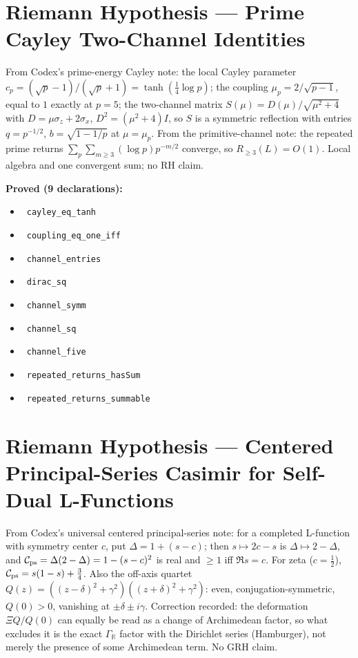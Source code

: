 \documentclass{report}
\theoremstyle{definition}
\begin{document}
\section{Riemann Hypothesis --- Prime Cayley Two-Channel Identities}
From Codex's prime-energy Cayley note: the local Cayley parameter $c_p=(\sqrt p-1)/(\sqrt p+1)=\tanh(\tfrac14\log p)$; the coupling $\mu_p=2/\sqrt{p-1}$, equal to $1$ exactly at $p=5$; the two-channel matrix $S(\mu)=D(\mu)/\sqrt{\mu^2+4}$ with $D=\mu\sigma_z+2\sigma_x$, $D^2=(\mu^2+4)I$, so $S$ is a symmetric reflection with entries $q=p^{-1/2}$, $b=\sqrt{1-1/p}$ at $\mu=\mu_p$. From the primitive-channel note: the repeated prime returns $\sum_p\sum_{m\ge3}(\log p)p^{-m/2}$ converge, so $R_{\ge3}(L)=O(1)$. Local algebra and one convergent sum; no RH claim.

\noindent\textbf{Proved (9 declarations):}
\begin{itemize}
  \item {}\leanok\ \texttt{cayley\_eq\_tanh}
  \item {}\leanok\ \texttt{coupling\_eq\_one\_iff}
  \item {}\leanok\ \texttt{channel\_entries}
  \item {}\leanok\ \texttt{dirac\_sq}
  \item {}\leanok\ \texttt{channel\_symm}
  \item {}\leanok\ \texttt{channel\_sq}
  \item {}\leanok\ \texttt{channel\_five}
  \item {}\leanok\ \texttt{repeated\_returns\_hasSum}
  \item {}\leanok\ \texttt{repeated\_returns\_summable}
\end{itemize}

\section{Riemann Hypothesis --- Centered Principal-Series Casimir for Self-Dual L-Functions}
From Codex's universal centered principal-series note: for a completed L-function with symmetry center $c$, put $\Delta=1+(s-c)$; then $s\mapsto 2c-s$ is $\Delta\mapsto2-\Delta$, and $\mathcal C_{\rm ps}=\Delta(2-\Delta)=1-(s-c)^2$ is real and $\ge1$ iff $\Re s=c$. For zeta ($c=\tfrac12$), $\mathcal C_{\rm ps}=s(1-s)+\tfrac34$. Also the off-axis quartet $Q(z)=((z-\delta)^2+\gamma^2)((z+\delta)^2+\gamma^2)$: even, conjugation-symmetric, $Q(0)>0$, vanishing at $\pm\delta\pm i\gamma$. Correction recorded: the deformation $\Xi Q/Q(0)$ can equally be read as a change of Archimedean factor, so what excludes it is the exact $\Gamma_\mathbb R$ factor with the Dirichlet series (Hamburger), not merely the presence of some Archimedean term. No GRH claim.
\end{document}
